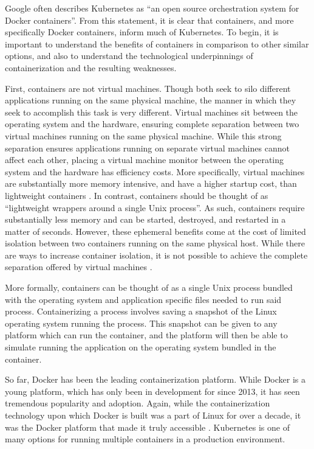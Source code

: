 Google often describes Kubernetes as ``an open source orchestration system for
Docker containers''\cite{k8s-website}. From this statement, it is clear that
containers, and more specifically Docker containers, inform much of Kubernetes.
To begin, it is important to understand the benefits of containers in comparison
to other similar options, and also to understand the technological underpinnings
of containerization and the resulting weaknesses.

First, containers are not virtual machines. Though both seek to silo different
applications running on the same physical machine, the manner in which they
seek to accomplish this task is very different. Virtual machines sit between the
operating system and the hardware, ensuring complete separation between two
virtual machines running on the same physical machine. While this strong
separation ensures applications running on separate virtual machines cannot
affect each other, placing a virtual machine monitor between the operating
system and the hardware has efficiency costs. More specifically, virtual
machines are substantially more memory intensive, and have a higher startup cost,
than lightweight containers \cite{distributed-systems-principles-and-paradigms}.
In contrast, containers should be thought of as ``lightweight wrappers around a
single Unix process''\cite[pg. 15]{docker-up-and-running}. As such, containers
require substantially less memory and can be started, destroyed, and restarted
in a matter of seconds. However, these ephemeral benefits come at the cost of
limited isolation between two containers running on the same physical host.
While there are ways to increase container isolation, it is not possible to
achieve the complete separation offered by virtual
machines \cite{docker-up-and-running}.

More formally, containers can be thought of as a single Unix process bundled
with the operating system and application specific files needed to run said process.
Containerizing a process involves saving a snapshot of the Linux operating system
running the process. This snapshot can be given to any platform which can run
the container, and the platform will then be able to simulate running the
application on the operating system bundled in the container.

So far, Docker has been the leading containerization platform. While Docker is a
young platform, which has only been in development for since 2013, it has seen
tremendous popularity and adoption. Again, while the containerization technology
upon which Docker is built was a part of Linux for over a decade, it was the
Docker platform that made it truly accessible \cite{docker-up-and-running}.
Kubernetes is one of many options for running multiple containers in a
production environment.
